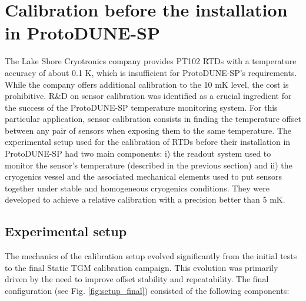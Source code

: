 \section{Calibration before the installation in ProtoDUNE-SP}
\label{sec:old_calib}

\noindent The Lake Shore Cryotronics company provides PT102 RTDs with a temperature accuracy of about 0.1 K, which is insufficient for ProtoDUNE-SP's requirements. While the company offers additional calibration to the 10 mK level, the cost is prohibitive. R\&D on sensor calibration was identified as a crucial ingredient for the success of the ProtoDUNE-SP temperature monitoring system. For this particular application, sensor calibration consists in finding the temperature offset between any pair of sensors when exposing them to the same temperature. The experimental setup used for the calibration of RTDs before their installation in ProtoDUNE-SP had two main components: i) the readout system used to monitor the sensor's temperature (described in the previous section) and ii) the cryogenics vessel and the associated mechanical elements used to put sensors together under stable and homogeneous cryogenics conditions. They were developed to achieve a relative calibration with a precision better than 5 mK. %

\subsection{Experimental setup}
\noindent The mechanics of the calibration setup evolved significantly from the initial tests to the final Static TGM  calibration campaign. This evolution was primarily driven by the need to improve offset stability and repeatability. The final configuration (see Fig. \ref{fig:setup_final}) consisted of the following components:

